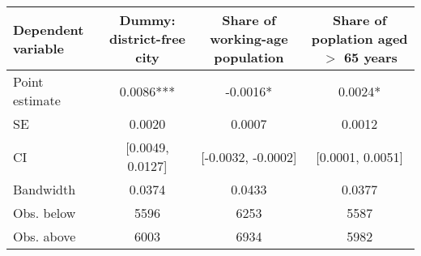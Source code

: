 \begin{tabular}{lccc}
  \toprule
 \midrule
Dependent variable & Dummy: district-free city & Share of working-age population & Share of poplation aged $>$ 65 years \\ 
  \midrule
Point estimate & 0.0086*** & -0.0016* & 0.0024* \\ 
  SE &  0.0020 &  0.0007 &  0.0012 \\ 
  CI & [0.0049, 0.0127] & [-0.0032, -0.0002] & [0.0001, 0.0051] \\ 
   \midrule
Bandwidth & 0.0374 & 0.0433 & 0.0377 \\ 
  Obs. below &  5596 &  6253 &  5587 \\ 
  Obs. above &  6003 &  6934 &  5982 \\ 
   \midrule
 \bottomrule
\end{tabular}
